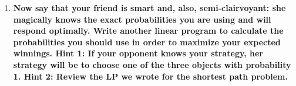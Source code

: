 \documentclass{article}
\begin{document}
\begin{enumerate}
\begin{enumerate}










\newpage
\item \textbf{Now say that your friend is smart and, also, semi-clairvoyant: she magically knows the exact probabilities you are using and will respond optimally. Write another linear program to calculate the probabilities you should use in order to maximize your expected winnings. Hint 1: If your opponent knows your strategy, her strategy will be to choose one of the three objects with probability 1. Hint 2: Review the LP we wrote for the shortest path problem. } \\






\end{enumerate}
\end{enumerate}
\end{document}
